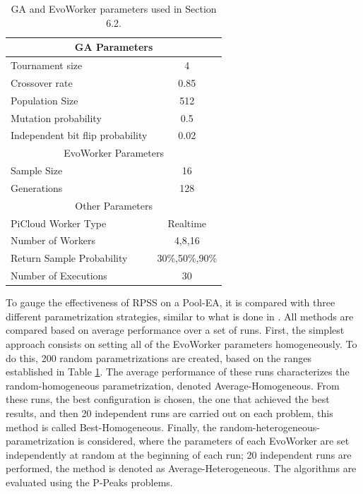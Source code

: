 \begin{table}[t]
\renewcommand{\arraystretch}{1.3}
\caption{GA and EvoWorker parameters used in Section 6.2.}
\label{tab:params}
\centering
\begin{tabular}{|l|c|}
\hline
\multicolumn{2}{|c|}{GA Parameters} \\
\hline
Tournament size & 4 \\
Crossover rate & 0.85  \\
Population Size & 512 \\
Mutation probability & 0.5 \\
Independent bit flip probability  & 0.02 \\
\hline
\multicolumn{2}{|c|}{EvoWorker Parameters} \\
\hline
Sample Size & 16 \\
Generations & 128 \\
\hline
\multicolumn{2}{|c|}{Other Parameters} \\
\hline
PiCloud Worker Type & Realtime \\
Number of Workers & 4,8,16 \\
Return Sample Probability & 30\%,50\%,90\% \\
Number of Executions & 30 \\

\hline

\end{tabular}
\end{table}

To gauge the effectiveness of RPSS on a Pool-EA, it is compared with three different parametrization strategies, similar to what is done in \cite{fuku1,fuku2}.
All methods are compared based on average performance over a set of runs.
First, the simplest approach consists on setting all of the EvoWorker parameters homogeneously.
To do this, 200 random parametrizations are created, based on the ranges established in Table \ref{tab:params}.
The average performance of these runs characterizes the random-homogeneous parametrization, denoted Average-Homogeneous.
From these runs, the best configuration is chosen, the one that achieved the best results,
and then 20 independent runs are carried out on each problem, this method is called Best-Homogeneous.
Finally, the random-heterogeneous-parametrization is considered, where the parameters of each EvoWorker are set independently at random at
the beginning of each run; 20 independent runs are performed, the method is denoted as Average-Heterogeneous.
The algorithms are evaluated using the P-Peaks problems.

